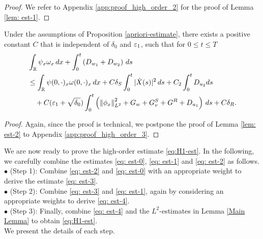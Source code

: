 \documentclass[11pt,reqno]{amsart}
\begin{document}
	
\begin{proof}
	We refer to Appendix \ref{app:proof_high_order_2} for the proof of Lemma \ref{lem: est-1}.
\end{proof}
	
\begin{lemma}\label{lem: est-2}
	Under the assumptions of Proposition \ref{apriori-estimate}, there exists a positive constant $C$ that is independent of $\delta_0$ and $\varepsilon_1$, such that for $0 \le t \le T$
	\begin{equation}\label{eq: est-2}
	\begin{aligned}
	&\int_{\mathbb{R}} \psi_x\omega_x \, dx+ \int_{0}^t \left( D_{w_1} + D_{w_2} \right) \, ds 
	\\
	&\le \int_{\mathbb{R}} \psi(0,\cdot)_x\omega(0,\cdot)_x \, dx+C \delta_S \int_0^t |\dot{X}(s)|^2 \, d s + C_2 \int_{0}^{t} D_{u_2} ds \\ 
	&\quad  +C(\varepsilon_1+\sqrt{\delta_0}) \int_0^t \left(\left\lVert\phi_x\right\rVert_{L^2}^2+G_w+G^S_v+G^R+D_{u_1} \right) \, d s+C \delta_R.
	\end{aligned}
	\end{equation}	
\end{lemma}
\begin{proof}
	Again, since the proof is technical, we postpone the proof of Lemma \ref{lem: est-2} to Appendix \ref{app:proof_high_order_3}.
\end{proof}


We are now ready to prove the high-order estimate \eqref{eq:H1-est}. In the following, we carefully combine the estimates \eqref{eq: est-0}, \eqref{eq: est-1} and \eqref{eq: est-2} as follows.\\
	
\noindent $\bullet$ (Step 1): Combine \eqref{eq: est-2} and \eqref{eq: est-0} with an appropriate weight to derive the estimate \eqref{eq: est-3}.\\
	
\noindent $\bullet$ (Step 2): Combine \eqref{eq: est-3} and \eqref{eq: est-1}, again by considering an appropriate weights to derive \eqref{eq: est-4}.\\
	
\noindent $\bullet$ (Step 3): Finally, combine \eqref{eq: est-4} and the $L^2$-estimates in Lemma \ref{Main Lemma} to obtain \eqref{eq:H1-est}. \\
	
We present the details of each step.\\
	
\end{document}
